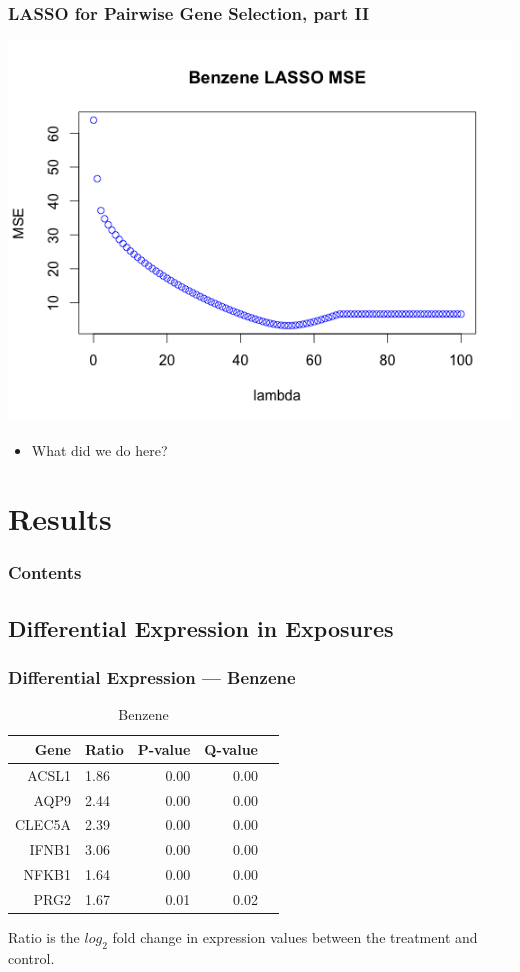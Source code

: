 \documentclass{beamer}
\begin{document}
\begin{frame}[fragile]
        \frametitle{LASSO for Pairwise Gene Selection, part II}
		\centering
                \includegraphics[scale=0.5]{../paper/figs/lasso_mse.png} 
                \begin{itemize}
			\item What did we do here?
		\end{itemize}
\end{frame}

\section{Results}

\begin{frame}
        \frametitle{Contents}
        \tableofcontents[currentsection,currentsubsection,hideothersubsections,sectionstyle=show/shaded]
\end{frame}

\subsection{Differential Expression in Exposures}

\begin{frame}[fragile]
  	\frametitle{Differential Expression --- Benzene}
 		\begin{table}[ht]
		\caption {Benzene} \label{tab:benzene} 
		\centering
		\begin{tabular}{rlrrr}
  			\hline
 			Gene & Ratio & P-value & Q-value \\ 
  			\hline
			ACSL1 & 1.86 & 0.00 & 0.00 \\ 
  			AQP9 & 2.44 & 0.00 & 0.00 \\ 
  			CLEC5A & 2.39 & 0.00 & 0.00 \\ 
  			IFNB1 & 3.06 & 0.00 & 0.00 \\ 
  			NFKB1 & 1.64 & 0.00 & 0.00 \\ 
  			PRG2 & 1.67 & 0.01 & 0.02 \\ 
   			\hline
		\end{tabular}
		\end{table}
		Ratio is the $log_{2}$ fold change in expression values between the treatment and control. 
\end{frame}
\end{document}
